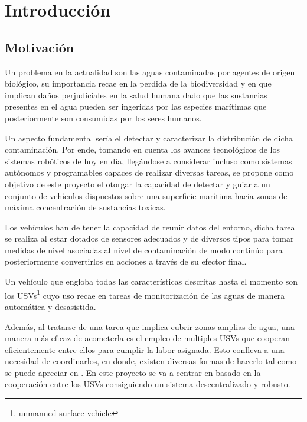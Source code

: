 

\chapter{Introducción} 
\label{ch:chapter1}
\setlength{\parindent}{0cm}
\setlength{\parskip}{4mm}

\section{Motivación}\label{Motiv}

Un problema en la actualidad son las aguas contaminadas por agentes de origen biológico, su importancia recae en la perdida de la biodiversidad y en que implican daños perjudiciales en la salud humana dado que las sustancias presentes en el agua pueden ser ingeridas por las especies marítimas que posteriormente son consumidas por los seres humanos.

Un aspecto fundamental sería el detectar y caracterizar la distribución de dicha contaminación. Por ende, tomando en cuenta los avances tecnológicos de los sistemas robóticos de hoy en día, llegándose a considerar incluso como sistemas autónomos y programables capaces de realizar diversas tareas, se propone como objetivo de este proyecto el otorgar la capacidad de detectar y guiar a un conjunto de vehículos dispuestos sobre una superficie marítima hacia zonas de máxima concentración de sustancias toxicas.

Los vehículos han de tener la capacidad de reunir datos del entorno, dicha tarea se realiza al estar dotados de sensores adecuados y de diversos tipos para tomar medidas de nivel asociadas al nivel de contaminación de modo continúo para posteriormente convertirlos en acciones a través de su efector final.

Un vehículo que engloba todas las características descritas hasta el momento son los USVs\footnote[1]{unmanned surface vehicle} cuyo uso recae en tareas de monitorización de las aguas de manera automática y desasistida.

Además, al tratarse de una tarea que implica cubrir zonas amplias de agua, una manera más eficaz de acometerla es el empleo de multiples USVs que cooperan eficientemente entre ellos para cumplir la labor asignada. Esto conlleva a una necesidad de coordinarlos, en donde, existen diversas formas de hacerlo tal como se puede apreciar en \cite{Otra_Coorporativa}. En este proyecto se va a centrar en \cite{Control_Formacion} basado en la cooperación entre los USVs consiguiendo un sistema descentralizado y robusto.\\

